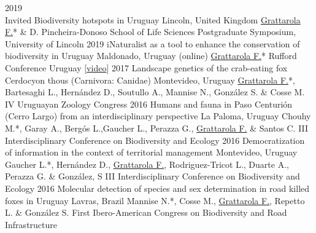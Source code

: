 \documentclass[9pt]{developercv} %
\begin{document}
\begin{entrylist}
	\entrylong
		{2019\\\footnotesize{Invited}}
		{Biodiversity hotspots in Uruguay}
		{Lincoln, United Kingdom}
		{\underline{Grattarola F.}* \& D. Pincheira-Donoso \slashsep School of Life Sciences Postgraduate Symposium, University of Lincoln}
	\entrylong
		{2019}
		{iNaturalist as a tool to enhance the conservation of biodiversity in Uruguay}
		{Maldonado, Uruguay (online)}
		{\underline{Grattarola F.}* \slashsep Rufford Conference Uruguay  [\href{https://youtu.be/3_lM-gPNLWY}{video}]}
	\entrylong
		{2017}
		{Landscape genetics of the crab-eating fox Cerdocyon thous (Carnivora: Canidae)}
		{Montevideo, Uruguay}
		{\underline{Grattarola F.}*, Bartesaghi L., Hernández D., Soutullo A., Mannise N., González S. \& Cosse M. \slashsep IV Uruguayan Zoology Congress}
	\entrylong
		{2016}
		{Humans and fauna in Paso Centurión (Cerro Largo) from an interdisciplinary perspective}
		{La Paloma, Uruguay}
		{Chouhy M.*, Garay A., Bergós L.,Gaucher L., Perazza G., \underline{Grattarola F.} \& Santos C. \slashsep III Interdisciplinary Conference on Biodiversity and Ecology}
	\entrylong
		{2016}
		{Democratization of information in the context of territorial management}
		{Montevideo, Uruguay}
		{Gaucher L.*, Hernández D., \underline{Grattarola F.}, Rodriguez-Tricot L., Duarte A., Perazza G. \& González, S \slashsep III Interdisciplinary Conference on Biodiversity and Ecology}
	\entrylong
		{2016}
		{Molecular detection of species and sex determination in road killed foxes in Uruguay}
		{Lavras, Brazil}
		{Mannise N.*, Cosse M., \underline{Grattarola F.}, Repetto L. \& González S. \slashsep First Ibero-American Congress on Biodiversity and Road Infrastructure}		
\end{entrylist}




\end{document}
